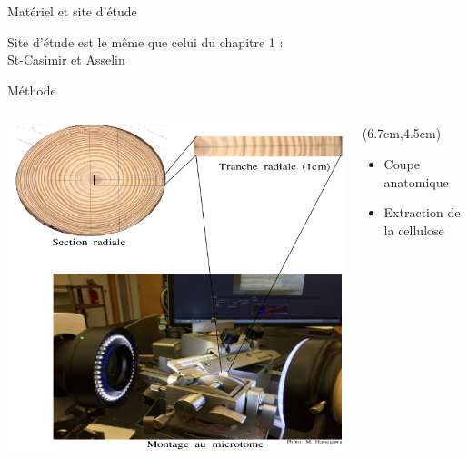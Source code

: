 \documentclass{beamer}
\begin{document}
\begin{frame}{Matériel et site d'étude}
	
	\Large Site d'étude est le même que celui du chapitre 1 :\\
	
	St-Casimir et Asselin
	
\end{frame}

\begin{frame}{Méthode}
	\begin{columns}			
		\begin{column}{0.5\textwidth}
			\includegraphics[width=\textwidth]{Mesure_sotopique.png}\\
		\end{column}
		\begin{column}{0.4\textwidth}
			\begin{textblock*}{6cm}(6.7cm,4.5cm)
				\begin{itemize} 
					\item Coupe anatomique\\
					\vspace{0.2cm}
					\item Extraction de la cellulose\\
				\end{itemize}
			\end{textblock*}		
		\end{column}
		

\end{columns}
\end{frame}
\end{document}
